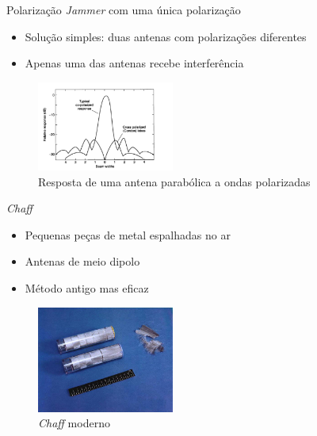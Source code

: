 \documentclass[portuguese,10pt]{beamer}
\begin{document}
\begin{frame}{Polarização}
\textit{Jammer} com uma única polarização
    \begin{itemize}
    \item<1-> Solução simples: duas antenas com polarizações diferentes
    \item<2-> Apenas uma das antenas recebe interferência
    \end{itemize}
    \begin{figure}[ht]
\centering
\includegraphics[width=0.4\textwidth]{graphics/parabolic_polarization_response.png}
\caption{Resposta de uma antena parabólica a ondas polarizadas}
\label{sidelobe_suppression}
\end{figure}
\end{frame}

\begin{frame}{\textit{Chaff}}
    \begin{itemize}
    \item<1-> Pequenas peças de metal espalhadas no ar
    \item<2-> Antenas de meio dipolo
    \item<3-> Método antigo mas eficaz
    \end{itemize}
    \begin{figure}[ht]
\centering
\includegraphics[width=0.4\textwidth]{graphics/Usnchaff.jpg}
\caption{\textit{Chaff} moderno}
\label{chaff_photo}
\end{figure}
\end{frame}
\end{document}
